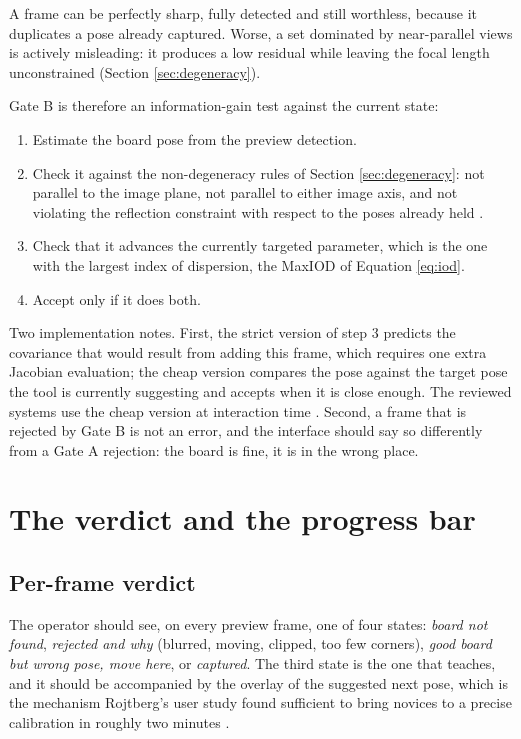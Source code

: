 A frame can be perfectly sharp, fully detected and still worthless, because it duplicates a pose already captured. Worse, a set dominated by near-parallel views is actively misleading: it produces a low residual while leaving the focal length unconstrained (Section \ref{sec:degeneracy}).

Gate B is therefore an information-gain test against the current state:

\begin{enumerate}
    \item Estimate the board pose from the preview detection.
    \item Check it against the non-degeneracy rules of Section \ref{sec:degeneracy}: not parallel to the image plane, not parallel to either image axis, and not violating the reflection constraint with respect to the poses already held \cite{rojtberg2018pose}.
    \item Check that it advances the currently targeted parameter, which is the one with the largest index of dispersion, the MaxIOD of Equation \ref{eq:iod}.
    \item Accept only if it does both.
\end{enumerate}

Two implementation notes. First, the strict version of step 3 predicts the covariance that would result from adding this frame, which requires one extra Jacobian evaluation; the cheap version compares the pose against the target pose the tool is currently suggesting and accepts when it is close enough. The reviewed systems use the cheap version at interaction time \cite{peng2019wizard,rojtberg2018pose}. Second, a frame that is rejected by Gate B is not an error, and the interface should say so differently from a Gate A rejection: the board is fine, it is in the wrong place.

\section{The verdict and the progress bar}

\subsection{Per-frame verdict}

The operator should see, on every preview frame, one of four states: \emph{board not found}, \emph{rejected and why} (blurred, moving, clipped, too few corners), \emph{good board but wrong pose, move here}, or \emph{captured}. The third state is the one that teaches, and it should be accompanied by the overlay of the suggested next pose, which is the mechanism Rojtberg's user study found sufficient to bring novices to a precise calibration in roughly two minutes \cite{rojtberg2019guidance}.

